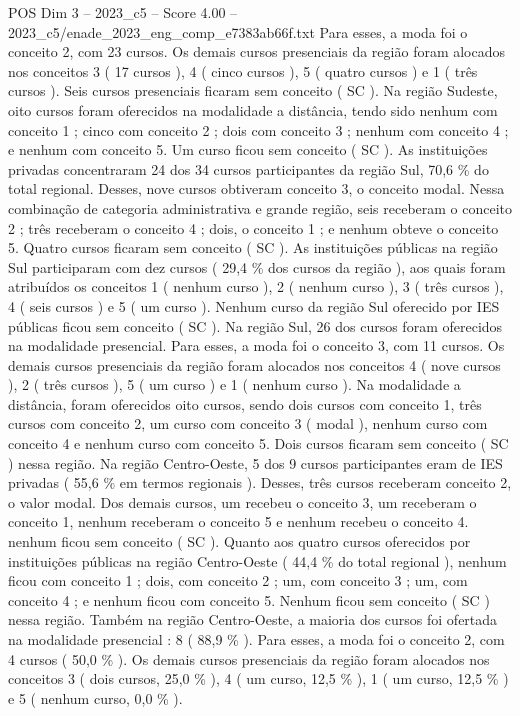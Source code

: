 \begin{textsample}{POS Dim 3 – 2023\_c5 – Score 4.00 – 2023\_c5/enade\_2023\_eng\_comp\_e7383ab66f.txt}
Para esses, a moda foi o conceito 2, com 23 cursos.
Os demais cursos presenciais da região foram alocados nos conceitos 3 ( 17 cursos ), 4 ( cinco cursos ), 5 ( quatro cursos ) e 1 ( três cursos ).
Seis cursos presenciais ficaram sem conceito ( SC ).
Na região Sudeste, oito cursos foram oferecidos na modalidade a distância, tendo sido nenhum com conceito 1 ; cinco com conceito 2 ; dois com conceito 3 ; nenhum com conceito 4 ; e nenhum com conceito 5.
Um curso ficou sem conceito ( SC ).
As instituições privadas concentraram 24 dos 34 cursos participantes da região Sul, 70,6 \% do total regional.
Desses, nove cursos obtiveram conceito 3, o conceito modal.
Nessa combinação de categoria administrativa e grande região, seis receberam o conceito 2 ; três receberam o conceito 4 ; dois, o conceito 1 ; e nenhum obteve o conceito 5.
Quatro cursos ficaram sem conceito ( SC ).
As instituições públicas na região Sul participaram com dez cursos ( 29,4 \% dos cursos da região ), aos quais foram atribuídos os conceitos 1 ( nenhum curso ), 2 ( nenhum curso ), 3 ( três cursos ), 4 ( seis cursos ) e 5 ( um curso ).
Nenhum curso da região Sul oferecido por IES públicas ficou sem conceito ( SC ).
Na região Sul, 26 dos cursos foram oferecidos na modalidade presencial.
Para esses, a moda foi o conceito 3, com 11 cursos.
Os demais cursos presenciais da região foram alocados nos conceitos 4 ( nove cursos ), 2 ( três cursos ), 5 ( um curso ) e 1 ( nenhum curso ).
Na modalidade a distância, foram oferecidos oito cursos, sendo dois cursos com conceito 1, três cursos com conceito 2, um curso com conceito 3 ( modal ), nenhum curso com conceito 4 e nenhum curso com conceito 5.
Dois cursos ficaram sem conceito ( SC ) nessa região.
Na região Centro-Oeste, 5 dos 9 cursos participantes eram de IES privadas ( 55,6 \% em termos regionais ).
Desses, três cursos receberam conceito 2, o valor modal.
Dos demais cursos, um recebeu o conceito 3, um receberam o conceito 1, nenhum receberam o conceito 5 e nenhum recebeu o conceito 4. nenhum ficou sem conceito ( SC ).
Quanto aos quatro cursos oferecidos por instituições públicas na região Centro-Oeste ( 44,4 \% do total regional ), nenhum ficou com conceito 1 ; dois, com conceito 2 ; um, com conceito 3 ; um, com conceito 4 ; e nenhum ficou com conceito 5.
Nenhum ficou sem conceito ( SC ) nessa região.
Também na região Centro-Oeste, a maioria dos cursos foi ofertada na modalidade presencial : 8 ( 88,9 \% ).
Para esses, a moda foi o conceito 2, com 4 cursos ( 50,0 \% ).
Os demais cursos presenciais da região foram alocados nos conceitos 3 ( dois cursos, 25,0 \% ), 4 ( um curso, 12,5 \% ), 1 ( um curso, 12,5 \% ) e 5 ( nenhum curso, 0,0 \% ).

\end{textsample}

